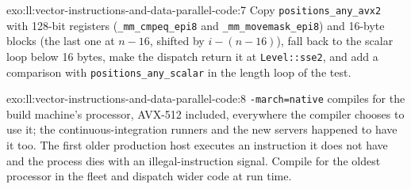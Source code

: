 \begin{solution}{exo:ll:vector-instructions-and-data-parallel-code:7}
Copy \texttt{positions\_any\_avx2} with 128-bit registers (\texttt{\_mm\_cmpeq\_epi8} and
\texttt{\_mm\_movemask\_epi8}) and 16-byte blocks (the last one at $n - 16$, shifted by $i - (n - 16)$), fall back to the scalar loop below 16 bytes, make the
dispatch return it at \texttt{Level::sse2}, and add a comparison with \texttt{positions\_any\_scalar} in the length loop of
the test.
\end{solution}

\begin{solution}{exo:ll:vector-instructions-and-data-parallel-code:8}
\texttt{-march=native} compiles for the build machine's processor, AVX-512 included, everywhere the compiler chooses to use
it; the continuous-integration runners and the new servers happened to have it too. The first older production host executes
an instruction it does not have and the process dies with an illegal-instruction signal. Compile for the oldest processor in
the fleet and dispatch wider code at run time.
\end{solution}

